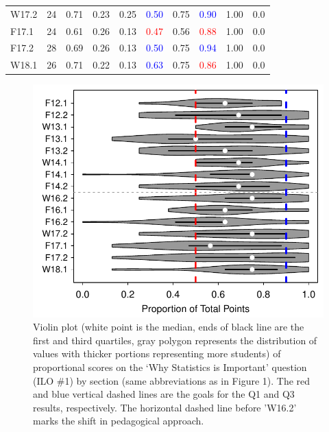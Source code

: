 \documentclass{article}\usepackage[]{graphicx}\usepackage[]{color}
\newenvironment{knitrout}{}{} %
\begin{document}
\begin{table}[h]
\begin{tabular}{lrrrrrrrrr}
  W17.2 & 24 & 0.71 & 0.23 & 0.25 & \textcolor{red}{\textcolor{blue}{0.50}} & 0.75 & \textcolor{red}{\textcolor{blue}{0.90}} & 1.00 & 0.0 \\ 
  F17.1 & 24 & 0.61 & 0.26 & 0.13 & \textcolor{red}{                   0.47} & 0.56 & \textcolor{red}{                   0.88} & 1.00 & 0.0 \\ 
  F17.2 & 28 & 0.69 & 0.26 & 0.13 & \textcolor{red}{\textcolor{blue}{0.50}} & 0.75 & \textcolor{red}{\textcolor{blue}{0.94}} & 1.00 & 0.0 \\ 
  W18.1 & 26 & 0.71 & 0.22 & 0.13 & \textcolor{red}{\textcolor{blue}{0.63}} & 0.75 & \textcolor{red}{                   0.86} & 1.00 & 0.0 \\ 
   \hline
\end{tabular}
\end{table}


\begin{knitrout}
\color{fgcolor}\begin{figure}[h]

{\centering \includegraphics[width=.6\linewidth]{Figs/WhyBar-1} 

}

\caption[Violin plot (white point is the median, ends of black line are the first and third quartiles, gray polygon represents the distribution of values with thicker portions representing more students) of proportional scores on the `Why Statistics is Important' question (ILO \#1) by section (same abbreviations as in Figure 1)]{Violin plot (white point is the median, ends of black line are the first and third quartiles, gray polygon represents the distribution of values with thicker portions representing more students) of proportional scores on the `Why Statistics is Important' question (ILO \#1) by section (same abbreviations as in Figure 1). The red and blue vertical dashed lines are the goals for the Q1 and Q3 results, respectively. The horizontal dashed line before 'W16.2' marks the shift in pedagogical approach.}\label{fig:WhyBar}
\end{figure}


\end{knitrout}
\end{document}
